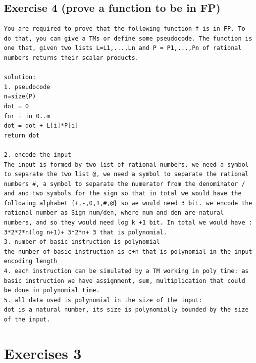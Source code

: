 \subsection{Exercise 4 (prove a function to be in FP)}
\begin{lstlisting}[breaklines]
You are required to prove that the following function f is in FP. To do that, you can give a TMs or define some pseudocode. The function is one that, given two lists L=L1,...,Ln and P = P1,...,Pn of rational numbers returns their scalar products.

solution:
1. pseudocode
n=size(P)
dot = 0
for i in 0..m
dot = dot + L[i]*P[i]
return dot

2. encode the input 
The input is formed by two list of rational numbers. we need a symbol to separate the two list @, we need a symbol to separate the rational numbers #, a symbol to separate the numerator from the denominator / and and two symbols for the sign so that in total we would have the following alphabet {+,-,0,1,#,@} so we would need 3 bit. we encode the rational number as Sign num/den, where num and den are natural numbers, and so they would need log k +1 bit. In total we would have : 3*2*2*n(log n+1)+ 3*2*n+ 3 that is polynomial.
3. number of basic instruction is polynomial
the number of basic instruction is c+n that is polynomial in the input encoding length
4. each instruction can be simulated by a TM working in poly time: as basic instruction we have assignment, sum, multiplication that could be done in polynomial time.
5. all data used is polynomial in the size of the input:
dot is a natural number, its size is polynomially bounded by the size of the input.
\end{lstlisting}



\section{Exercises 3}
